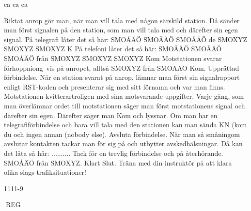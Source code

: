 ca ca ca

Riktat anrop gör man, när man vill tala med
någon särskild station. Då sänder man först
signalen på den station, som man vill tala
med och därefter sin egen signal.
På telegrafi låter det så här:
SMOÅÄÖ SMOÅÄÖ SMOÅÄÖ de SMOXYZ
SMOXYZ SMOXYZ K
På telefoni låter det så här:
SMOÅÄÖ SMOÅÄÖ SMOÅÄÖ från SMOXYZ
SMOXYZ SMOXYZ Kom
Motstationen svarar förhoppniong~vis på
anropet, alltså SMOXYZ från SMOAAO Kom.
Upprättad förbindelse. När en station svarat
på anrop, lämnar man först sin signalrapport
enligt RST-koden och presenterar sig med
sitt förnamn och var man finns. Motstationen
kvitterartroligen med sina motsvarande uppgifter. Varje gång, som man överlämnar ordet till motstationen säger man först motstationens signal och därefter sin egen. Därefter säger man Kom och lyssnar. Om man
har en telegrafiförbindelse och bara vill tala
med den stationen kan man sända KN (kom
du och ingen annan (nobody else).
Avsluta förbindelse. När man så småningom
avslutar kontakten tackar man för sig på och
utbytter avskedhälsningar.
Då kan det låta så här:
.......... Tack för en trevlig förbindelse och på
återhörande. SMOÅÄÖ från SMOXYZ. Klart
Slut.
Träna med din instruktör på att klara olika
slags trafiksituationer!

1111-9

REG
